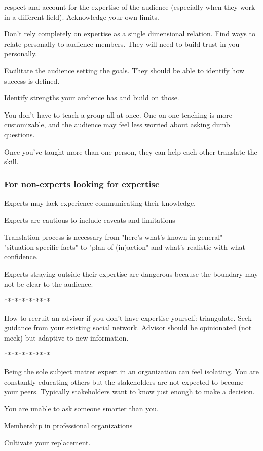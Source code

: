 respect and account for the expertise of the audience (especially when they work in a different field). Acknowledge your own limits.

Don't rely completely on expertise as a single dimensional relation. Find ways to relate personally to audience members. They will need to build trust in you personally.

Facilitate the audience setting the goals. They should be able to identify how success is defined.

Identify strengths your audience has and build on those.

You don't have to teach a group all-at-once. One-on-one teaching is more customizable, and the audience may feel less worried about asking dumb questions.

Once you've taught more than one person, they can help each other translate the skill. 


\subsubsection{For non-experts looking for expertise}

Experts may lack experience communicating their knowledge. 

Experts are cautious to include caveats and limitations

Translation process is necessary from "here's what's known in general" + "situation specific facts" to "plan of (in)action" and what's realistic with what confidence. 

Experts straying outside their expertise are dangerous because the boundary may not be clear to the audience.

*************

How to recruit an advisor if you don't have expertise yourself: triangulate. Seek guidance from your existing social network. Advisor should be opinionated (not meek) but adaptive to new information. 

*************

Being the sole subject matter expert in an organization can feel isolating. You are constantly educating others but the stakeholders are not expected to become your peers. Typically stakeholders want to know just enough to make a decision. 

You are unable to ask someone smarter than you. 

Membership in professional organizations

Cultivate your replacement. 
